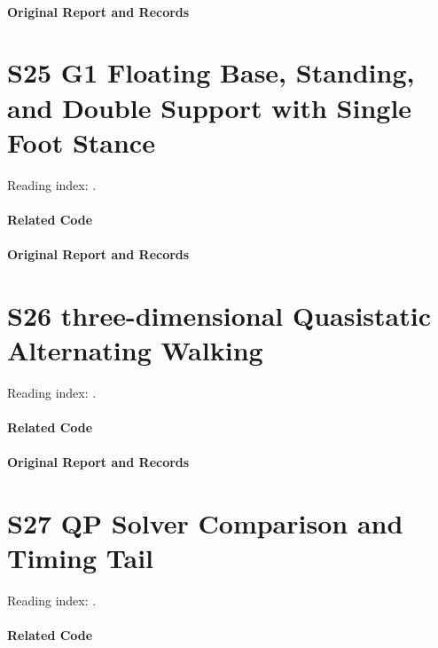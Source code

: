 \paragraph{Original Report and Records}
\noindent{}\par
\section*{S25 G1 Floating Base, Standing, and Double Support with Single Foot Stance}
\hypertarget{code-s25}{}
Reading index: .
\paragraph{Related Code}
\noindent{}\par
\paragraph{Original Report and Records}
\noindent{}\par
\section*{S26 three-dimensional Quasistatic Alternating Walking}
\hypertarget{code-s26}{}
Reading index: .
\paragraph{Related Code}
\noindent{}\par
\paragraph{Original Report and Records}
\noindent{}\par
\section*{S27 QP Solver Comparison and Timing Tail}
\hypertarget{code-s27}{}
Reading index: .
\paragraph{Related Code}
\noindent{}\par
